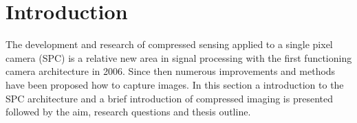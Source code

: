 \section{Introduction}
The development and research of compressed sensing applied to a single pixel camera (SPC) is a relative new area in signal processing with the first functioning camera architecture in 2006. Since then numerous improvements and methods have been proposed how to capture images. In this section a introduction to the SPC architecture and a brief introduction of compressed imaging is presented followed by the aim, research questions and thesis outline. 

%

